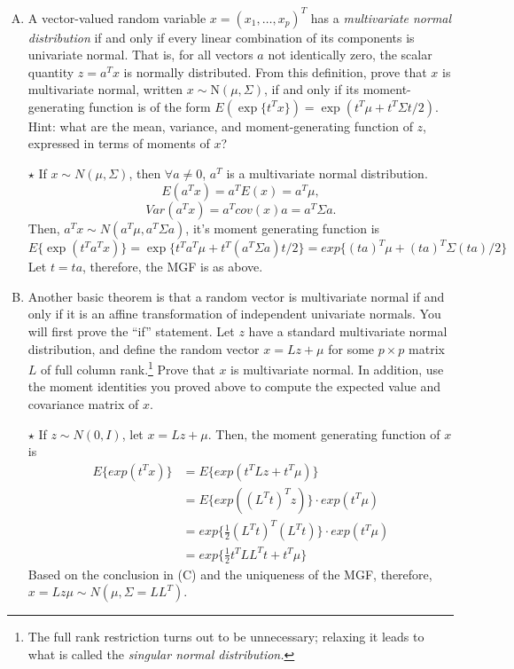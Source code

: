 \documentclass[11pt]{article}
\newcommand{\jie}{$\star$ }
\newcommand{\half}{\frac{1}{2}}
\newcommand{\N}{\mbox{N}}
\begin{document}
\begin{enumerate}[(A)]
\bigskip

\item A vector-valued random variable $x = (x_1, \ldots, x_p)^T$ has a \textit{multivariate normal distribution} if and only if every linear combination of its components is univariate normal.  That is, for all vectors $a$ not identically zero, the scalar quantity $z = a^T x$ is normally distributed.  From this definition, prove that $x$ is multivariate normal, written $x \sim \N(\mu, \Sigma)$, if and only if its moment-generating function is of the form $E(\exp \{t^T x\}) = \exp(t^T \mu + t^T \Sigma t / 2)$.  Hint: what are the mean, variance, and moment-generating function of $z$, expressed in terms of moments of $x$?

\bigskip

\jie
If $x \sim N(\mu,\Sigma)$, then $\forall a \neq 0$, $a^T$ is a multivariate normal distribution.
$$E(a^Tx) = a^TE(x) = a^T\mu,$$
$$Var(a^Tx) = a^T cov(x) a = a^T \Sigma a.$$
Then, $a^T x \sim N(a^T\mu,a^T \Sigma a)$, it's moment generating function is
$$E\{\exp(t^Ta^Tx)\} = \exp\{t^Ta^T\mu + t^T(a^T\Sigma a)t/2\} = exp\{ (ta)^T \mu + (ta)^T \Sigma (ta)/2\} $$
Let $t= ta$, therefore, the MGF is as above.



\bigskip

\item Another basic theorem is that a random vector is multivariate normal if and only if it is an affine transformation of independent univariate normals.  You will first prove the ``if'' statement.  Let $z$ have a standard multivariate normal distribution, and define the random vector $x = L z + \mu$ for some $p \times p$ matrix $L$ of full column rank.\footnote{The full rank restriction turns out to be unnecessary; relaxing it leads to what is called the \textit{singular normal distribution.}}   Prove that $x$ is multivariate normal.  In addition, use the moment identities you proved above to compute the expected value and covariance matrix of $x$.  

\bigskip

\jie
If $z \sim N(0,I)$, let $x = Lz + \mu$. Then, the moment generating function of $x$ is
\begin{align*}
	E\{ exp(t^T x) \} &= E\{ exp(t^T Lz + t^T \mu) \} \\
	&= E\{exp((L^Tt)^Tz)\} \cdot exp(t^T\mu) \\
	&= exp\{ \half (L^Tt)^T(L^Tt)\} \cdot exp(t^T\mu) \\
	&= exp\{ \half t^TLL^Tt+t^T\mu \}
\end{align*}
Based on the conclusion in (C) and the uniqueness of the MGF, therefore, $x = Lz \mu \sim N(\mu,\Sigma=LL^T)$.


\end{enumerate}
\end{document}
